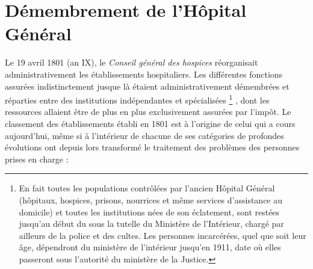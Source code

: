 \section{Démembrement de l'Hôpital Général}

 Le 19 avril 1801 (an IX), le \emph{Conseil général des hospices} réorganisait administrativement les établissements hospitaliers. Les différentes fonctions assurées indistinctement jusque là étaient administrativement démembrées et réparties entre des institutions indépendantes et spécialisées%
\footnote{En fait toutes les populations contrôlées par l'ancien Hôpital Général (hôpitaux, hospices, prisons, nourrices et même services d'assistance au domicile) et toutes les institutions nées de son éclatement, sont restées jusqu'au début du  sous la tutelle du Ministère de l'Intérieur, chargé par ailleurs de la police et des cultes. Les personnes incarcérées, quel que soit leur âge, dépendront du ministère de l'intérieur jusqu'en 1911, date où elles passeront sous l'autorité du ministère de la Justice.}%
, dont les ressources allaient être de plus en plus exclusivement assurées par l'impôt. Le classement des établissements établi en 1801 est à l'origine de celui qui a cours aujourd'hui, même si à l'intérieur de chacune de ses catégories de profondes évolutions ont depuis lors transformé le traitement des problèmes des personnes prises en charge :

